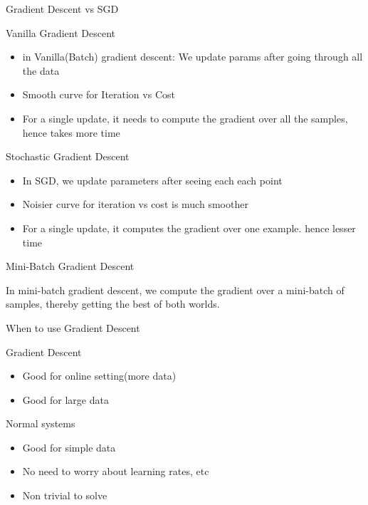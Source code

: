 \documentclass{beamer}
\begin{document}
	
	
	
	\begin{frame}{Gradient Descent vs SGD}
		
		
		
		Vanilla Gradient Descent
		\begin{itemize}
			\item 
			in Vanilla(Batch) gradient descent: We update params after going through all the data 
			\item Smooth curve for Iteration vs Cost
			\item For a single update, it needs to compute the gradient over all the samples, hence takes more time
			
		\end{itemize}
		
		Stochastic Gradient Descent
		\begin{itemize}
			\item In SGD, we update parameters after seeing each each point
			\item Noisier curve for iteration vs cost is much smoother
			\item  For a single update, it computes the gradient over one example. hence lesser time
		\end{itemize}
		
		
	\end{frame}
	
	\begin{frame}{Mini-Batch Gradient Descent}
		
		In mini-batch gradient descent, we compute the gradient over a mini-batch of samples, thereby getting the best of both worlds.
		
	\end{frame}
	
	\begin{frame}{When to use Gradient Descent}
		
		
		Gradient Descent
		\begin{itemize}
			\item Good for online setting(more data)
			\item Good for large data
		\end{itemize}
		
		
		Normal systems
		\begin{itemize}
			\item Good for simple data
			\item No need to worry about learning rates, etc
			\item Non trivial to solve
		\end{itemize}
	\end{frame}
	
\end{document}
